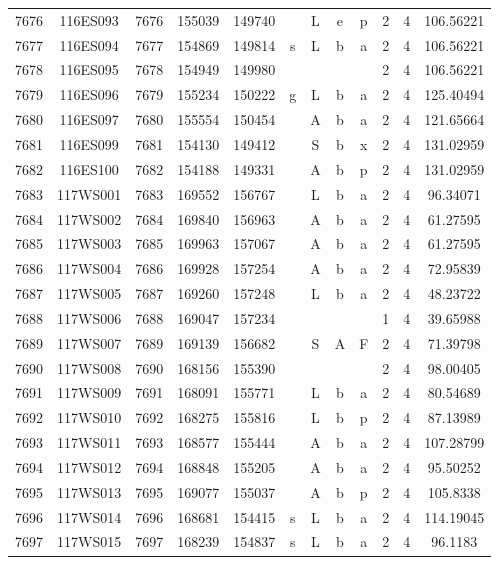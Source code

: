 \begin{tabular}{|*{12}{c|}}
7676 & 116ES093 & 7676 & 155039 & 149740 &  & L & e & p & 2 & 4 & 106.56221 \\ 
7677 & 116ES094 & 7677 & 154869 & 149814 & s & L & b & a & 2 & 4 & 106.56221 \\ 
7678 & 116ES095 & 7678 & 154949 & 149980 &  &  &  &  & 2 & 4 & 106.56221 \\ 
7679 & 116ES096 & 7679 & 155234 & 150222 & g & L & b & a & 2 & 4 & 125.40494 \\ 
7680 & 116ES097 & 7680 & 155554 & 150454 &  & A & b & a & 2 & 4 & 121.65664 \\ 
7681 & 116ES099 & 7681 & 154130 & 149412 &  & S & b & x & 2 & 4 & 131.02959 \\ 
7682 & 116ES100 & 7682 & 154188 & 149331 &  & A & b & p & 2 & 4 & 131.02959 \\ 
7683 & 117WS001 & 7683 & 169552 & 156767 &  & L & b & a & 2 & 4 & 96.34071 \\ 
7684 & 117WS002 & 7684 & 169840 & 156963 &  & A & b & a & 2 & 4 & 61.27595 \\ 
7685 & 117WS003 & 7685 & 169963 & 157067 &  & A & b & a & 2 & 4 & 61.27595 \\ 
7686 & 117WS004 & 7686 & 169928 & 157254 &  & A & b & a & 2 & 4 & 72.95839 \\ 
7687 & 117WS005 & 7687 & 169260 & 157248 &  & L & b & a & 2 & 4 & 48.23722 \\ 
7688 & 117WS006 & 7688 & 169047 & 157234 &  &  &  &  & 1 & 4 & 39.65988 \\ 
7689 & 117WS007 & 7689 & 169139 & 156682 &  & S & A & F & 2 & 4 & 71.39798 \\ 
7690 & 117WS008 & 7690 & 168156 & 155390 &  &  &  &  & 2 & 4 & 98.00405 \\ 
7691 & 117WS009 & 7691 & 168091 & 155771 &  & L & b & a & 2 & 4 & 80.54689 \\ 
7692 & 117WS010 & 7692 & 168275 & 155816 &  & L & b & p & 2 & 4 & 87.13989 \\ 
7693 & 117WS011 & 7693 & 168577 & 155444 &  & A & b & a & 2 & 4 & 107.28799 \\ 
7694 & 117WS012 & 7694 & 168848 & 155205 &  & A & b & a & 2 & 4 & 95.50252 \\ 
7695 & 117WS013 & 7695 & 169077 & 155037 &  & A & b & p & 2 & 4 & 105.8338 \\ 
7696 & 117WS014 & 7696 & 168681 & 154415 & s & L & b & a & 2 & 4 & 114.19045 \\ 
7697 & 117WS015 & 7697 & 168239 & 154837 & s & L & b & a & 2 & 4 & 96.1183 \\ 

\end{tabular}
